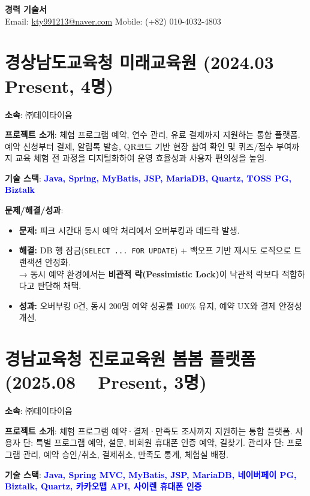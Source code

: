 \documentclass[a4paper,11pt]{article}
\newcommand{\tech}[1]{\textbf{\textcolor{blue}{#1}}}
\begin{document}
\begin{center}
    {\LARGE \textbf{경력 기술서}} \\[6pt]
    Email: \href{mailto:kty991213@naver.com}{kty991213@naver.com} \quad
    Mobile: (+82) 010-4032-4803
\end{center}

\section{경상남도교육청 미래교육원 (2024.03 ~ Present, 4명)}

\textbf{소속}: ㈜데이타이음  

\textbf{프로젝트 소개}:  
체험 프로그램 예약, 연수 관리, 유료 결제까지 지원하는 통합 플랫폼.  
예약 신청부터 결제, 알림톡 발송, QR코드 기반 현장 참여 확인 및 퀴즈/점수 부여까지  
교육 체험 전 과정을 디지털화하여 운영 효율성과 사용자 편의성을 높임.  

\textbf{기술 스택}: \tech{Java, Spring, MyBatis, JSP, MariaDB, Quartz, TOSS PG, Biztalk}  

\textbf{문제/해결/성과}:
\begin{itemize}[leftmargin=*]
  \item \textbf{문제:} 피크 시간대 동시 예약 처리에서 오버부킹과 데드락 발생.
  \item \textbf{해결:} DB 행 잠금(\texttt{SELECT ... FOR UPDATE}) + 백오프 기반 재시도 로직으로 트랜잭션 안정화. \\
  → 동시 예약 환경에서는 \textbf{비관적 락(Pessimistic Lock)}이 낙관적 락보다 적합하다고 판단해 채택.
  \item \textbf{성과:} 오버부킹 0건, 동시 200명 예약 성공률 100\% 유지, 예약 UX와 결제 안정성 개선.
\end{itemize}

\section{경남교육청 진로교육원 봄봄 플랫폼 (2025.08 ~ Present, 3명)}

\textbf{소속}: ㈜데이타이음  

\textbf{프로젝트 소개}:  
체험 프로그램 예약·결제·만족도 조사까지 지원하는 통합 플랫폼.  
사용자 단: 특별 프로그램 예약, 설문, 비회원 휴대폰 인증 예약, 길찾기.  
관리자 단: 프로그램 관리, 예약 승인/취소, 결제취소, 만족도 통계, 체험실 배정.  

\textbf{기술 스택}: \tech{Java, Spring MVC, MyBatis, JSP, MariaDB, 네이버페이 PG, Biztalk, Quartz, 카카오맵 API, 사이렌 휴대폰 인증}  
\end{document}
